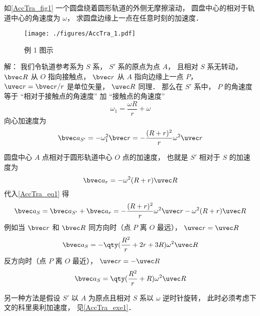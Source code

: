 \begin{example}{}\label{AccTra_ex1}
如\autoref{AccTra_fig1} 一个圆盘绕着圆形轨道的外侧无摩擦滚动， 圆盘中心的相对于轨道中心的角速度为 $\omega$， 求圆盘边缘上一点在任意时刻的加速度．
\begin{figure}[ht]
\centering
\texttt{[image: ./figures/AccTra\_1.pdf]}
\caption{例 1 图示} \label{AccTra_fig1}
\end{figure}

解： 我们令轨道参考系为 $S$ 系， $S'$ 系的原点为点 $A$， 且相对 $S$ 系无转动， $\bvec R$ 从 $O$ 指向接触点， $\bvec r$ 从 $A$ 指向边缘上一点 $P$， $\uvec r = \bvec r/r$ 是单位矢量， $\uvec R$ 同理． 那么在 $S'$ 系中， $P$ 的角速度等于 “相对于接触点的角速度” 加 “接触点的角速度”
\begin{equation}
\omega_1 = \frac{\omega R}{r} + \omega
\end{equation}
向心加速度为
\begin{equation}
\bvec a_{S'} = -\omega_1^2 \bvec r = -\frac{(R+r)^2}{r} \omega^2\uvec r
\end{equation}

圆盘中心 $A$ 点相对于圆形轨道中心 $O$ 点的加速度， 也就是 $S'$ 相对于 $S$ 的加速度为
\begin{equation}
\bvec a_r = -\omega^2 (R + r)\uvec R
\end{equation}
代入\autoref{AccTra_eq1} 得
\begin{equation}
\bvec a_S = \bvec a_{S'} + \bvec a_r = -\frac{(R+r)^2}{r} \omega^2\uvec r -\omega^2 (R + r)\uvec R
\end{equation}
例如当 $\bvec r$ 和 $\bvec R$ 同方向时（点 $P$ 离 $O$ 最远）， $\uvec r = \uvec R$
\begin{equation}
\bvec a_S = -\qty(\frac{R^2}{r} + 2r + 3R)\omega^2 \uvec R
\end{equation}
反方向时（点 $P$ 离 $O$ 最近）， $\uvec r = -\uvec R$
\begin{equation}
\bvec a_S = \qty(\frac{R^2}{r} + R)\omega^2\uvec R
\end{equation}



另一种方法是假设 $S'$ 以 $A$ 为原点且相对 $S$ 系以 $\omega$ 逆时针旋转， 此时必须考虑下文的科里奥利加速度， 见\autoref{AccTra_exe1}．
\end{example}

